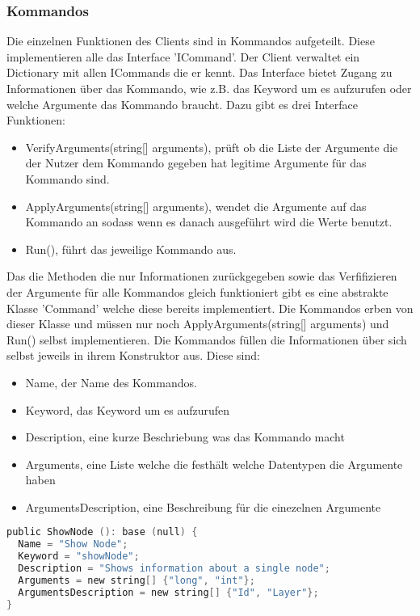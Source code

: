 \subsubsection{Kommandos}

Die einzelnen Funktionen des Clients sind in Kommandos aufgeteilt.
Diese implementieren alle das Interface 'ICommand'. Der Client verwaltet ein Dictionary mit allen ICommands die er kennt.
Das Interface bietet Zugang zu Informationen über das Kommando, wie z.B. das Keyword um es aufzurufen oder welche Argumente das Kommando braucht.
Dazu gibt es drei Interface Funktionen:

\begin{itemize}
  \item VerifyArguments(string[] arguments), prüft ob die Liste der Argumente die der Nutzer dem Kommando gegeben hat legitime Argumente für das Kommando sind.
  \item ApplyArguments(string[] arguments), wendet die Argumente auf das Kommando an sodass wenn es danach ausgeführt wird die Werte benutzt.
  \item Run(), führt das jeweilige Kommando aus.
\end{itemize}

Das die Methoden die nur Informationen zurückgegeben sowie das Verfifizieren der Argumente für alle Kommandos gleich funktioniert gibt es eine abstrakte Klasse
'Command' welche diese bereits implementiert. Die Kommandos erben von dieser Klasse und müssen nur noch ApplyArguments(string[] arguments) und Run() selbst implementieren.
Die Kommandos füllen die Informationen über sich selbst jeweils in ihrem Konstruktor aus. Diese sind:

\begin{itemize}
  \item Name, der Name des Kommandos.
  \item Keyword, das Keyword um es aufzurufen
  \item Description, eine kurze Beschriebung was das Kommando macht
  \item Arguments, eine Liste welche die festhält welche Datentypen die Argumente haben
  \item ArgumentsDescription, eine Beschreibung für die einezelnen Argumente
\end{itemize}

\begin{lstlisting}[language=c]
public ShowNode (): base (null) {
  Name = "Show Node";
  Keyword = "showNode";
  Description = "Shows information about a single node";
  Arguments = new string[] {"long", "int"};
  ArgumentsDescription = new string[] {"Id", "Layer"};
}
\end{lstlisting}


